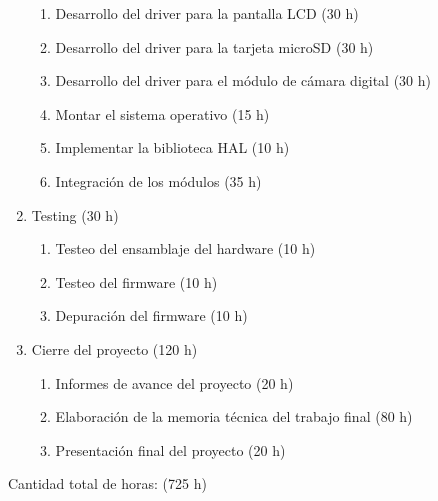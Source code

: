 \documentclass[
11pt, %
]{charter}
\begin{document}
\begin{enumerate}
\begin{enumerate}
	\item Desarrollo del driver para la pantalla LCD (30 h)
	\item Desarrollo del driver para la tarjeta microSD (30 h)
    \item Desarrollo del driver para el módulo de cámara digital (30 h)
	\item Montar el sistema operativo (15 h)
    \item Implementar la biblioteca HAL (10 h)
	\item Integración de los módulos (35 h)
	\end{enumerate}
 \item Testing (30 h)
	\begin{enumerate}
	\item Testeo del ensamblaje del hardware (10 h)
	\item Testeo del firmware (10 h)
	\item Depuración del firmware (10 h)
	\end{enumerate}
 \item Cierre del proyecto (120 h)
	\begin{enumerate}
	\item Informes de avance del proyecto (20 h)
	\item Elaboración de la memoria técnica del trabajo final (80 h)
	\item Presentación final del proyecto (20 h)
	\end{enumerate}
\end{enumerate}

Cantidad total de horas: (725 h)
\end{document}
